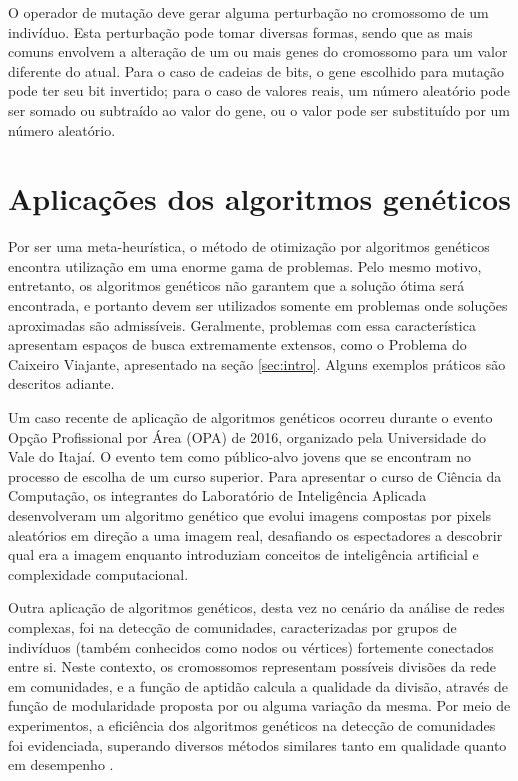 \documentclass[12pt]{article}
\begin{document}
O operador de mutação deve gerar alguma perturbação no cromossomo de um indivíduo. Esta perturbação pode tomar diversas formas, sendo que as mais comuns envolvem a alteração de um ou mais genes do cromossomo para um valor diferente do atual. Para o caso de cadeias de bits, o gene escolhido para mutação pode ter seu bit invertido; para o caso de valores reais, um número aleatório pode ser somado ou subtraído ao valor do gene, ou o valor pode ser substituído por um número aleatório.

\section{Aplicações dos algoritmos genéticos} \label{sec:applications}

Por ser uma meta-heurística, o método de otimização por algoritmos genéticos encontra utilização em uma enorme gama de problemas. Pelo mesmo motivo, entretanto, os algoritmos genéticos não garantem que a solução ótima será encontrada, e portanto devem ser utilizados somente em problemas onde soluções aproximadas são admissíveis. Geralmente, problemas com essa característica apresentam espaços de busca extremamente extensos, como o Problema do Caixeiro Viajante, apresentado na seção \ref{sec:intro}. Alguns exemplos práticos são descritos adiante.

Um caso recente de aplicação de algoritmos genéticos ocorreu durante o evento Opção Profissional por Área (OPA) de 2016, organizado pela Universidade do Vale do Itajaí. O evento tem como público-alvo jovens que se encontram no processo de escolha de um curso superior. Para apresentar o curso de Ciência da Computação, os integrantes do Laboratório de Inteligência Aplicada desenvolveram um algoritmo genético que evolui imagens compostas por pixels aleatórios em direção a uma imagem real, desafiando os espectadores a descobrir qual era a imagem enquanto introduziam conceitos de inteligência artificial e complexidade computacional.

Outra aplicação de algoritmos genéticos, desta vez no cenário da análise de redes complexas, foi na detecção de comunidades, caracterizadas por grupos de indivíduos (também conhecidos como nodos ou vértices) fortemente conectados entre si. Neste contexto, os cromossomos representam possíveis divisões da rede em comunidades, e a função de aptidão calcula a qualidade da divisão, através de função de modularidade proposta por \cite{Newman2004} ou alguma variação da mesma. Por meio de experimentos, a eficiência dos algoritmos genéticos na detecção de comunidades foi evidenciada, superando diversos métodos similares tanto em qualidade quanto em desempenho \cite{Tasgin2007,Pizzuti2008}.
\end{document}
